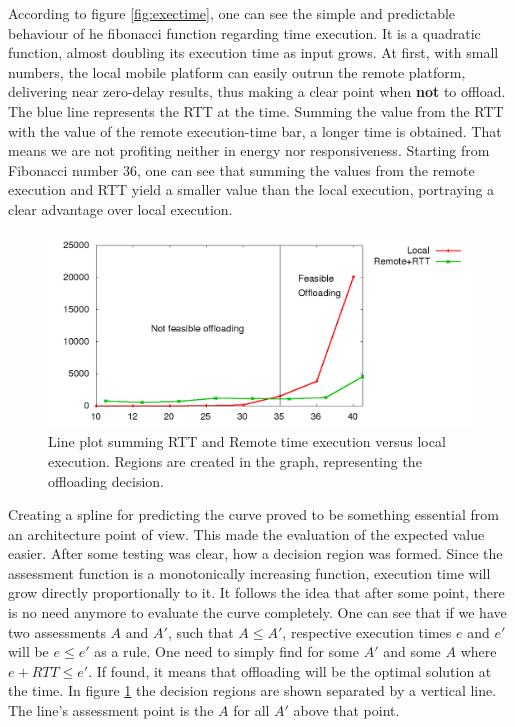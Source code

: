\documentclass[10pt, conference, letterpaper]{IEEEtran}
\begin{document}
  According to figure \ref{fig:exectime}, one can see the simple and predictable behaviour of he fibonacci function regarding time execution. It is a quadratic function, almost doubling its execution time as input grows. At first, with small numbers, the local mobile platform can easily outrun the remote platform, delivering near zero-delay results, thus making a clear point when \textbf{not} to offload. The blue line represents the RTT at the time. Summing the value from the RTT with the value of the remote execution-time bar, a longer time is obtained. That means we are not profiting neither in energy nor responsiveness. Starting from Fibonacci number 36, one can see that summing the values from the remote execution and RTT yield a smaller value than the local execution, portraying a clear advantage over local execution.

\begin{figure}[!t]
  \centering
  \includegraphics[width=1\textwidth]{plots/threshold/executions.png}
  \caption{Line plot summing RTT and Remote time execution versus local execution. Regions are created in the graph, representing the offloading decision.}
  \label{fig:graphregions}
\end{figure}

Creating a spline for predicting the curve proved to be something essential from an architecture point of view. This made the evaluation of the expected value easier. After some testing was clear, how a decision region was formed. Since the assessment function is a monotonically increasing function, execution time will grow directly proportionally to it. It follows the idea that after some point, there is no need anymore to evaluate the curve completely. One can see that if we have two assessments $A$ and $A'$, such that $A \leq A'$, respective execution times $e$ and $e'$ will be $e \leq e'$ as a rule. One need to simply find for some $A'$ and some $A$ where $e + RTT \leq e'$. If found, it means that offloading will be the optimal solution at the time. In figure \ref{fig:graphregions} the decision regions are shown separated by a vertical line. The line's assessment point is the $A$ for all $A'$ above that point.
\end{document}
